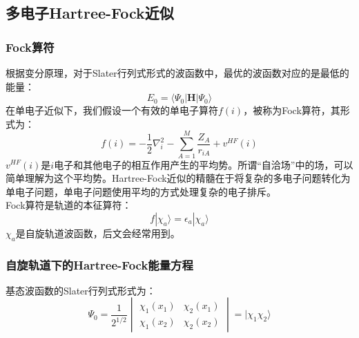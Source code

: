 \documentclass[12pt, a4paper, oneside]{ctexart}
\begin{document}
\subsection{多电子Hartree-Fock近似}
\subsubsection{Fock算符}
根据变分原理，对于Slater行列式形式的波函数中，最优的波函数对应的是最低的能量：
\begin{equation}
E_0=\langle\Psi_0|\mathbf{H}|\Psi_0\rangle
\end{equation}
在单电子近似下，我们假设一个有效的单电子算符$f(i)$，被称为Fock算符，其形式为：
\begin{equation}
f(i)=-\frac12\nabla_i^2-\sum_{A=1}^M\frac{Z_A}{r_{iA}}+v^{HF}(i)
\end{equation}
$v^{HF}(i)$是$i$电子和其他电子的相互作用产生的平均势。所谓“自洽场”中的场，可以简单理解为这个平均势。Hartree-Fock近似的精髓在于将复杂的多电子问题转化为单电子问题，单电子问题使用平均的方式处理复杂的电子排斥。\\
Fock算符是轨道的本征算符：
\begin{equation}
f|\chi_a\rangle=\epsilon_a|\chi_a\rangle
\end{equation}
$\chi_a$是自旋轨道波函数，后文会经常用到。
\subsubsection{自旋轨道下的Hartree-Fock能量方程}
基态波函数的Slater行列式形式为：
\begin{equation}
\Psi_0=\frac1{2^{1/2}}
\begin{vmatrix}
\chi_1(x_1) & \chi_2(x_1)\\
\chi_1(x_2) & \chi_2(x_2)
\end{vmatrix}
=|\chi_1\chi_2\rangle
\end{equation}
\end{document}
